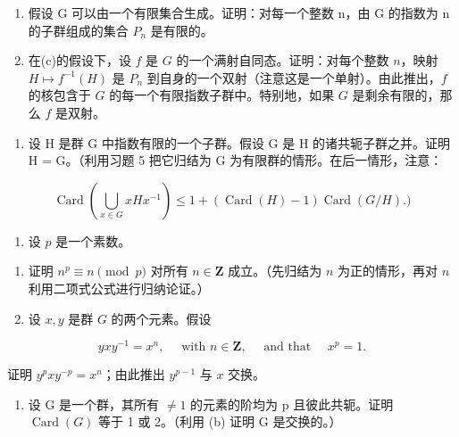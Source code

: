 \begin{enumerate}
\def\labelenumi{(\alph{enumi})}
\setcounter{enumi}{2}
\item
  假设 G 可以由一个有限集合生成。证明：对每一个整数 n，由 G 的指数为 n 的子群组成的集合 \(P_{n}\) 是有限的。
\item
  在(c)的假设下，设 \(f\) 是 \(G\) 的一个满射自同态。证明：对每个整数 \(n\)，映射 \(H \mapsto f^{-1}(H)\) 是 \(P_n\) 到自身的一个双射（注意这是一个单射）。由此推出，\(f\) 的核包含于 \(G\) 的每一个有限指数子群中。特别地，如果 \(G\) 是剩余有限的，那么 \(f\) 是双射。
\end{enumerate}

\begin{enumerate}
\def\labelenumi{\arabic{enumi}。}
\setcounter{enumi}{5}
\tightlist
\item
  设 H 是群 G 中指数有限的一个子群。假设 G 是 H 的诸共轭子群之并。证明 H = G。（利用习题 5 把它归结为 G 为有限群的情形。在后一情形，注意：
\end{enumerate}

\[
\operatorname{Card} \left(\bigcup_ {x \in G} x H x ^ {- 1}\right) \leqslant 1 + (\operatorname{Card} (H) - 1) \operatorname{Card} (G / H).)
\]

\begin{enumerate}
\def\labelenumi{\arabic{enumi}。}
\setcounter{enumi}{6}
\tightlist
\item
  设 \(p\) 是一个素数。
\end{enumerate}

\begin{enumerate}
\def\labelenumi{(\alph{enumi})}
\item
  证明 \(n^p \equiv n \pmod{p}\) 对所有 \(n \in \mathbf{Z}\) 成立。（先归结为 \(n\) 为正的情形，再对 \(n\) 利用二项式公式进行归纳论证。）
\item
  设 \(x, y\) 是群 \(G\) 的两个元素。假设
\end{enumerate}

\[
y x y ^ {- 1} = x ^ {n}, \quad \text { with } n \in \mathbf {Z}, \quad \text { and   that } \quad x ^ {p} = 1.
\]

证明 \(y^{p}xy^{-p} = x^{n}\)；由此推出 \(y^{p - 1}\) 与 \(x\) 交换。

\begin{enumerate}
\def\labelenumi{(\alph{enumi})}
\setcounter{enumi}{2}
\tightlist
\item
  设 G 是一个群，其所有 \(\neq1\) 的元素的阶均为 p 且彼此共轭。证明 \(\operatorname{Card}(G)\) 等于 1 或 2。（利用 (b) 证明 G 是交换的。）
\end{enumerate}

